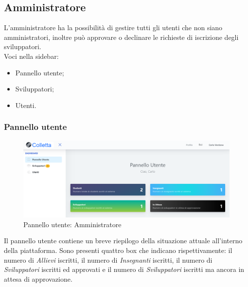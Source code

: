 	\newpage
	\subsection{Amministratore}
	L'amministratore ha la possibilità di gestire tutti gli utenti che non siano amministratori, inoltre può approvare o declinare le richieste di iscrizione degli sviluppatori.
		  \\Voci nella sidebar:
			\begin{itemize}
				\item Pannello utente;
				\item Sviluppatori;
				\item Utenti.
			\end{itemize}



		\subsubsection{Pannello utente}
			\begin{figure}[H]
				\centering
				\includegraphics[width=17cm]{sez/img/amministratore/panelloadmin.PNG}
				\caption{Pannello utente: Amministratore}\label{fig:1}
			\end{figure}
		Il pannello utente contiene un breve riepilogo della situazione attuale all'interno della piattaforma.
		Sono presenti quattro box che indicano rispettivamente: il numero di \textit{Allievi} iscritti, il numero di \textit{Insegnanti} iscritti, il numero di \textit{Sviluppatori} iscritti ed approvati e il numero di \textit{Sviluppatori} iscritti ma ancora in attesa di approvazione.

